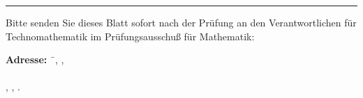 \rule{\textwidth}{0.5pt}
Bitte senden Sie dieses Blatt sofort nach der Pr\"ufung an den
Verantwortlichen f\"ur Technomathematik im Pr\"ufungsausschu\ss{} f\"ur
Mathematik:

\begin{tabbing}
{\bf Adresse:} \ \= \ProfessorName, \InstitutName, \\\\
\> \UniName, \InstitutAnschrift, \InstitutOrt.
\end{tabbing}
